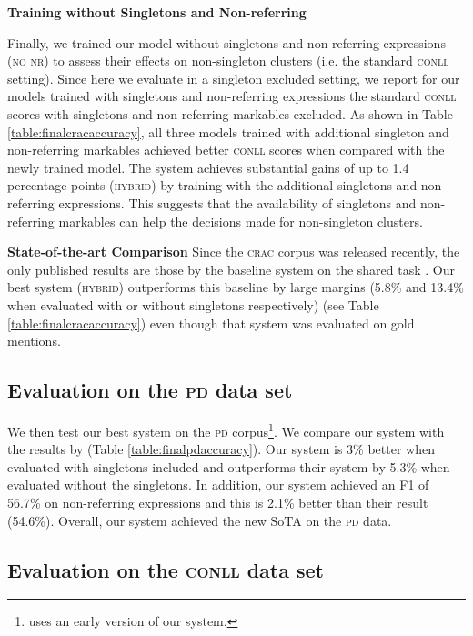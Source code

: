 \documentclass[10pt, a4paper]{article}
\newcommand{\ACRO}[1]{\textsc{#1}}
\newcommand{\CONLL}{\ACRO{conll}}
\newcommand{\CRAC}{\ACRO{crac}}
\newcommand{\PD}{\ACRO{pd}}
\newcommand{\HYBRID}{\ACRO{hybrid}}
\newcommand{\NONR}{\ACRO{no nr}}
\begin{document}
\textbf{Training without Singletons and Non-referring} 

Finally, we trained our model without singletons and non-referring expressions ({\NONR}) to assess their effects on non-singleton clusters (i.e. the standard {\CONLL} setting). Since here we evaluate in a singleton excluded setting, we report for our models trained with singletons and non-referring expressions the standard {\CONLL} scores with singletons and non-referring markables excluded.  
As shown  
in Table \ref{table:finalcracaccuracy}, all three models trained with additional singleton and non-referring markables achieved better {\CONLL} scores when compared with the newly trained model. 
The system achieves substantial  
gains of up to 1.4 percentage points ({\HYBRID}) by training with the additional singletons and non-referring expressions. This suggests that the availability of singletons and non-referring markables can help the decisions made for non-singleton clusters. 


\textbf{State-of-the-art Comparison} Since the {\CRAC} corpus was released recently, the only published results are those by the baseline system \cite{lee-et-al:CL13} on the shared task \cite{poesio2018crac}. Our best system ({\HYBRID}) outperforms this baseline by large margins (5.8\% and 13.4\% when evaluated with or without singletons respectively) (see Table \ref{table:finalcracaccuracy}) even though that system was evaluated on gold mentions. 




\subsection{Evaluation on the {\PD} data set}
We then test our best system on the {\PD} corpus\footnote{ uses an early version of our system.}. We compare our system with the results by  (Table \ref{table:finalpdaccuracy}). Our system is 3\% better when evaluated with singletons included and outperforms their system by 5.3\% when evaluated without the singletons. In addition, our system achieved an F1 of 56.7\% on non-referring expressions and this is 2.1\% better than their result (54.6\%). Overall, our system achieved the new SoTA on the {\PD} data.







\subsection{Evaluation on the {\CONLL} data set}
\end{document}
